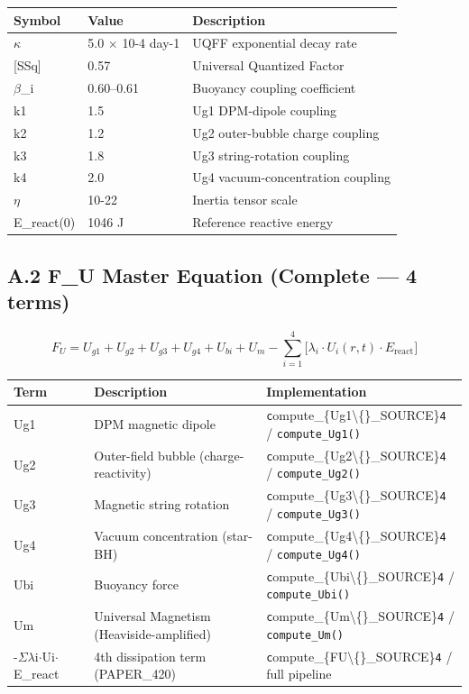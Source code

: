 \documentclass[11pt]{article}
\begin{document}
\begin{center}
\begin{longtable}{lll}
\toprule
Symbol & Value & Description \tabularnewline
\midrule
\endhead
$\kappa$ & 5.0 $\times$ 10-4 day-1 & UQFF exponential decay rate \tabularnewline
{}[SSq] & 0.57 & Universal Quantized Factor \tabularnewline
$\beta$\_i & 0.60--0.61 & Buoyancy coupling coefficient \tabularnewline
k1 & 1.5 & Ug1 DPM-dipole coupling \tabularnewline
k2 & 1.2 & Ug2 outer-bubble charge coupling \tabularnewline
k3 & 1.8 & Ug3 string-rotation coupling \tabularnewline
k4 & 2.0 & Ug4 vacuum-concentration coupling \tabularnewline
$\eta$ & 10-22 & Inertia tensor scale \tabularnewline
E\_react(0) & 1046 J & Reference reactive energy \tabularnewline
\bottomrule
\end{longtable}
\end{center}

\subsection*{A.2 F\_U Master Equation (Complete --- 4 terms)}

$$F_U = U_{g1} + U_{g2} + U_{g3} + U_{g4} + U_{bi} + U_m - \sum_{i=1}^{4}\bigl[\lambda_i \cdot U_i(r,t) \cdot E_{\mathrm{react}}\bigr]$$

\begin{center}
\begin{longtable}{lll}
\toprule
Term & Description & Implementation \tabularnewline
\midrule
\endhead
Ug1 & DPM magnetic dipole & \verb|c|ompute\_\{Ug1\textbackslash\{\}\_SOURCE\}\verb|4| / \verb|compute_Ug1()| \tabularnewline
Ug2 & Outer-field bubble (charge-reactivity) & \verb|c|ompute\_\{Ug2\textbackslash\{\}\_SOURCE\}\verb|4| / \verb|compute_Ug2()| \tabularnewline
Ug3 & Magnetic string rotation & \verb|c|ompute\_\{Ug3\textbackslash\{\}\_SOURCE\}\verb|4| / \verb|compute_Ug3()| \tabularnewline
Ug4 & Vacuum concentration (star-BH) & \verb|c|ompute\_\{Ug4\textbackslash\{\}\_SOURCE\}\verb|4| / \verb|compute_Ug4()| \tabularnewline
Ubi & Buoyancy force & \verb|c|ompute\_\{Ubi\textbackslash\{\}\_SOURCE\}\verb|4| / \verb|compute_Ubi()| \tabularnewline
Um & Universal Magnetism (Heaviside-amplified) & \verb|c|ompute\_\{Um\textbackslash\{\}\_SOURCE\}\verb|4| / \verb|compute_Um()| \tabularnewline
-$\Sigma$$\lambda$i$\cdot$Ui$\cdot$E\_react & 4th dissipation term (PAPER\_420) & \verb|c|ompute\_\{FU\textbackslash\{\}\_SOURCE\}\verb|4| / full pipeline \tabularnewline
\bottomrule
\end{longtable}
\end{center}
\end{document}
